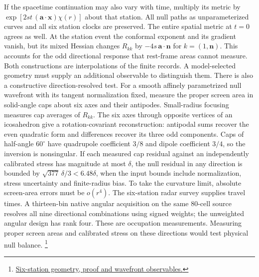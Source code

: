 \documentclass[11pt]{article}
\begin{document}
If the spacetime continuation may also vary with time, multiply its
metric by $\exp[2st\,(\mathbf a\cdot\mathbf x)\chi(r)]$ about that
station. All null paths as unparameterized curves and all six station
clocks are preserved. The entire spatial metric at $t=0$ agrees as well.
At the station event the conformal exponent and its gradient vanish,
but its mixed Hessian changes $R_{kk}$ by $-4s\,\mathbf a\cdot\mathbf n$
for $k=(1,\mathbf n)$. This accounts for the odd directional response
that rest-frame areas cannot measure. Both constructions are
interpolations of the finite records. A model-selected geometry must
supply an additional observable to distinguish them.
There is also a constructive direction-resolved test. For a smooth
affinely parametrized null wavefront with its tangent normalization
fixed, measure the proper screen area in solid-angle caps about six
axes and their antipodes. Small-radius focusing measures cap averages
of $R_{kk}$. The six axes through opposite vertices of an icosahedron
give a rotation-covariant reconstruction: antipodal sums recover the
even quadratic form and differences recover its three odd components. Caps of half-angle
$60^\circ$ have quadrupole coefficient $3/8$ and dipole coefficient
$3/4$, so the inversion is nonsingular. If each measured cap residual against
an independently calibrated stress has magnitude at most $\delta$, the
null residual in any direction is bounded by $\sqrt{377}\,\delta/3
<6.48\delta$, when the input bounds include normalization, stress
uncertainty and finite-radius bias. To take the curvature limit,
absolute screen-area errors must be $o(r^4)$. The six-station radar
survey supplies travel times. A thirteen-bin native angular acquisition
on the same 80-cell source resolves all nine directional combinations
using signed weights; the unweighted angular design has rank four.
These are occupation measurements. Measuring proper screen areas and
calibrated stress on these directions would test physical null balance.
\footnote{\href{https://github.com/FloatingPragma/observer-patch-holography/tree/main/code/matched_einstein_limit/source_implication/full_geometry/station_balls}{Six-station geometry, proof and wavefront observables.}}
\end{document}
